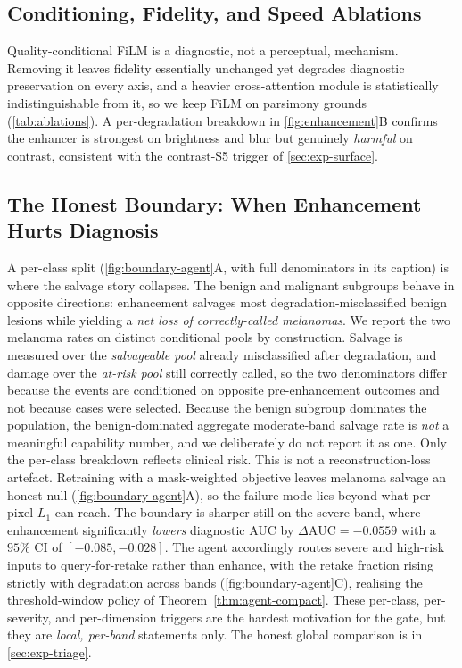\subsection{Conditioning, Fidelity, and Speed Ablations}\label{sec:exp-ablations}
Quality-conditional FiLM is a diagnostic, not a perceptual, mechanism. Removing it leaves
fidelity essentially unchanged yet degrades diagnostic preservation on every axis, and a
heavier cross-attention module is statistically indistinguishable from it, so we keep FiLM
on parsimony grounds (\cref{tab:ablations}). A per-degradation breakdown in
\cref{fig:enhancement}B confirms the enhancer is strongest on brightness and blur but
genuinely \emph{harmful} on contrast, consistent with the contrast-S5 trigger of
\cref{sec:exp-surface}.


\subsection{The Honest Boundary: When Enhancement Hurts Diagnosis}
\label{sec:exp-boundary}
A per-class split (\cref{fig:boundary-agent}A, with full denominators in its caption) is
where the salvage story collapses. The benign and malignant subgroups behave in opposite
directions: enhancement salvages most degradation-misclassified benign lesions while
yielding a \emph{net loss of correctly-called melanomas}. We report the two melanoma rates
on distinct conditional pools by construction. Salvage is measured over the
\emph{salvageable pool} already misclassified after degradation, and damage over the
\emph{at-risk pool} still correctly called, so the two denominators differ because the
events are conditioned on opposite pre-enhancement outcomes and not because cases were
selected. Because the benign subgroup dominates the population, the benign-dominated
aggregate moderate-band salvage rate is \emph{not} a meaningful capability number, and we
deliberately do not report it as one. Only the per-class breakdown reflects clinical risk.
This is not a reconstruction-loss artefact. Retraining with a mask-weighted objective
leaves melanoma salvage an honest null (\cref{fig:boundary-agent}A), so the failure mode
lies beyond what per-pixel $L_1$ can reach. The boundary is sharper still on the severe
band, where enhancement significantly \emph{lowers} diagnostic AUC by
$\Delta\mathrm{AUC}=-0.0559$ with a $95\%$ CI of $[-0.085,-0.028]$. The agent accordingly
routes severe and high-risk inputs to query-for-retake rather than enhance, with the retake
fraction rising strictly with degradation across bands (\cref{fig:boundary-agent}C),
realising the threshold-window policy of Theorem~\ref{thm:agent-compact}. These per-class,
per-severity, and per-dimension triggers are the hardest motivation for the gate, but they
are \emph{local, per-band} statements only. The honest global comparison is in
\cref{sec:exp-triage}.


